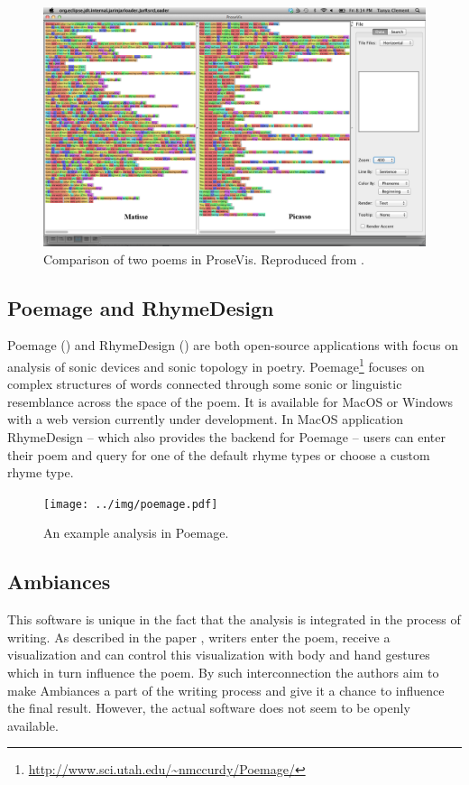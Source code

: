 \begin{figure}[h]\centering
	\includegraphics[scale=0.24]{../img/prosevis.png}
	\caption[Comparison of two poems in ProseVis]{Comparison of two poems in ProseVis. Reproduced from \cite{prosevis2017sourceforge}.}\label{screenshotProsevis}
\end{figure}

\subsection{Poemage and RhymeDesign}
Poemage (\cite{McCurdy2015poemage}) and RhymeDesign (\cite{McCurdy2015}) are both open-source applications with focus on analysis of sonic devices and sonic topology in poetry. Poemage\footnote{\url{http://www.sci.utah.edu/~nmccurdy/Poemage/}} focuses on complex structures of words connected through some sonic or linguistic resemblance across the space of the poem. It is available for MacOS or Windows with a web version currently under development. In MacOS application RhymeDesign -- which also provides the backend for Poemage -- users can enter their poem and query for one of the default rhyme types or choose a custom rhyme type.

\begin{figure}[h]\centering
	\texttt{[image: ../img/poemage.pdf]}
	\caption{An example analysis in Poemage.}\label{screenshotPoemage}
\end{figure}

\subsection{Ambiances}
This software is unique in the fact that the analysis is integrated in the process of writing. As described in the paper \cite{Meneses2015}, writers enter the poem, receive a visualization and can control this visualization with body and hand gestures which in turn influence the poem. By such interconnection the authors aim to make Ambiances a part of the writing process and give it a chance to influence the final result. However, the actual software does not seem to be openly available.


